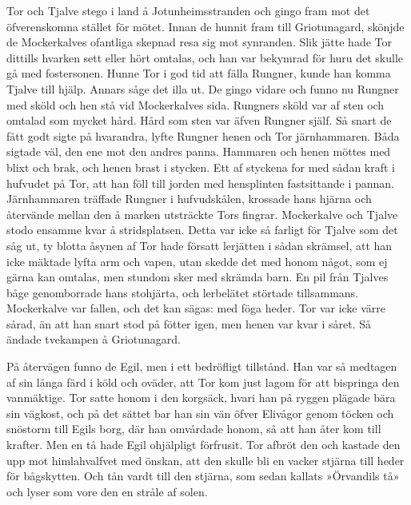 Tor och Tjalve stego i land å Jotunheimsstranden och gingo fram mot det
öfverenskomna stället för mötet. Innan de hunnit fram till Griotunagard,
skönjde de Mockerkalves ofantliga skepnad resa sig mot synranden. Slik
jätte hade Tor dittills hvarken sett eller hört omtalas, och han var
bekymrad för huru det skulle gå med fostersonen. Hunne Tor i god tid att
fälla Rungner, kunde han komma Tjalve till hjälp. Annars såge det illa
ut. De gingo vidare och funno nu Rungner med sköld och hen stå vid
Mockerkalves sida. Rungners sköld var af sten och omtalad som mycket
hård. Hård som sten var äfven Rungner själf. Så snart de fått godt sigte
på hvarandra, lyfte Rungner henen och Tor järnhammaren. Båda sigtade
väl, den ene mot den andres panna. Hammaren och henen möttes med blixt
och brak, och henen brast i stycken.
\protect\hypertarget{lb1625905.xhtmlux5cux23start66}{}{}\protect\hypertarget{lb1625905.xhtmlux5cux23start66-a}{}{}\protect\hypertarget{lb1625905.xhtmlux5cux23start66-b}{}{}\protect\hypertarget{lb1625905.xhtmlux5cux23start66-c}{}{}\protect\hypertarget{lb1625905.xhtmlux5cux23start66-d}{}{}
Ett af styckena for med sådan kraft i hufvudet på Tor, att han föll till
jorden med hensplinten fastsittande i pannan. Järnhammaren träffade
Rungner i hufvudskålen, krossade hans hjärna och återvände mellan den å
marken utsträckte Tors fingrar. Mockerkalve och Tjalve stodo ensamme
kvar å stridsplatsen. Detta var icke så farligt för Tjalve som det såg
ut, ty blotta åsynen af Tor hade försatt lerjätten i sådan skrämsel, att
han icke mäktade lyfta arm och vapen, utan skedde det med honom något,
som ej gärna kan omtalas, men stundom sker med skrämda barn. En pil från
Tjalves båge genomborrade hans stohjärta, och lerbelätet störtade
tillsammans. Mockerkalve var fallen, och det kan sägas: med föga heder.
Tor var icke värre sårad, än att han snart stod på fötter igen, men
henen var kvar i såret. Så ändade tvekampen å Griotunagard.

På återvägen funno de Egil, men i ett bedröfligt tillstånd. Han var så
medtagen af sin långa färd i köld och oväder, att Tor kom just lagom för
att bispringa den vanmäktige. Tor satte honom i den korgsäck, hvari han
på ryggen plägade bära sin vägkost, och på det sättet bar han sin vän
öfver Elivågor genom töcken och snöstorm till Egils borg, där han
omvårdade honom, så att han åter kom till krafter. Men en tå hade Egil
ohjälpligt förfrusit. Tor afbröt den och kastade den upp mot
himlahvalfvet med önskan, att den skulle bli en vacker stjärna till
heder för bågskytten. Och tån vardt till den stjärna, som sedan kallats
»Örvandils tå» och lyser som vore den en stråle af solen.

